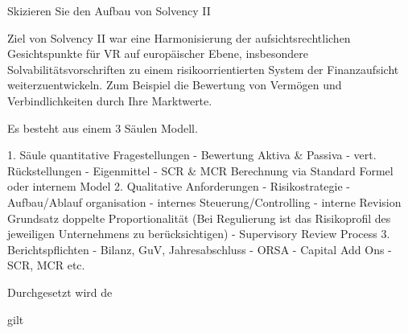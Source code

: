 Skizieren Sie den Aufbau von Solvency II


Ziel von Solvency II war eine Harmonisierung der aufsichtsrechtlichen Gesichtspunkte für VR auf europäischer Ebene,
insbesondere Solvabilitätsvorschriften zu einem risikoorrientierten System der Finanzaufsicht weiterzuentwickeln. 
Zum Beispiel die Bewertung von Vermögen und Verbindlichkeiten durch Ihre Marktwerte.

Es besteht aus einem 3 Säulen Modell.

1. Säule quantitative Fragestellungen
- Bewertung Aktiva & Passiva
- vert. Rückstellungen
- Eigenmittel
- SCR & MCR
Berechnung via Standard Formel oder internem Model
2. Qualitative Anforderungen 
- Risikostrategie
- Aufbau/Ablauf organisation
- internes Steuerung/Controlling
- interne Revision
Grundsatz doppelte Proportionalität
(Bei Regulierung ist das Risikoprofil des jeweiligen Unternehmens zu berücksichtigen)
- Supervisory Review Process
3. Berichtspflichten
- Bilanz, GuV, Jahresabschluss
- ORSA
- Capital Add Ons
- SCR, MCR
etc. 

Durchgesetzt wird de

gilt 



